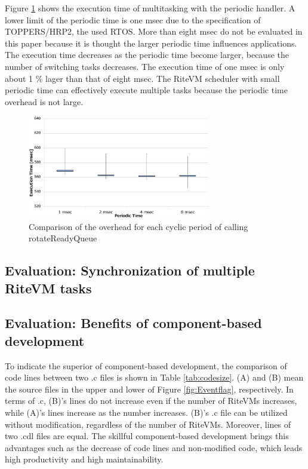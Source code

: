 \documentclass{sig-alternate-05-2015}
\begin{document}
Figure \ref{fig:comparison_msec} shows the execution time of multitasking with the periodic handler.
A lower limit of the periodic time is one msec due to the specification of TOPPERS/HRP2, the used RTOS.
More than eight msec do not be evaluated in this paper because it is thought the larger periodic time influences applications.
The execution time decreases as the periodic time become larger, because the number of switching tasks decreases.
The execution time of one msec is only about 1 \% lager than that of eight msec.
The RiteVM scheduler with small periodic time can effectively execute multiple tasks because the periodic time overhead is not large.

\begin{figure}[t]
    \centering
    \includegraphics[width=8cm,clip]{figure/comparison_msec.eps}
    \caption{Comparison of the overhead for each cyclic period of calling rotateReadyQueue}
    \label{fig:comparison_msec}
\end{figure}

\subsection{Evaluation: Synchronization of multiple RiteVM tasks}

\subsection{Evaluation: Benefits of component-based development}
To indicate the superior of component-based development, the comparison of code lines between two .c files is shown in Table \ref{tab:codesize}.
(A) and (B) mean the source files in the upper and lower of Figure \ref{fig:Eventflag}, respectively. 
In terms of .c, (B)'s lines do not increase even if the number of RiteVMs increases, while (A)'s lines increase as the number increases.
(B)'s .c file can be utilized without modification, regardless of the number of RiteVMs.
Moreover, lines of two .cdl files are equal.
The skillful component-based development brings this advantages such as the decrease of code lines and non-modified code, which leads high productivity and high maintainability.
\end{document}
